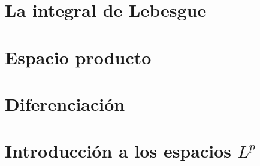 \documentclass{article}
\begin{document}
\newpage
\section{La integral de Lebesgue}

\newpage
\section{Espacio producto}

\newpage
\section{Diferenciación}

\newpage
\section{Introducción a los espacios \texorpdfstring{$L^{p}$}{}}

\newpage
\printbibliography %
\end{document}
